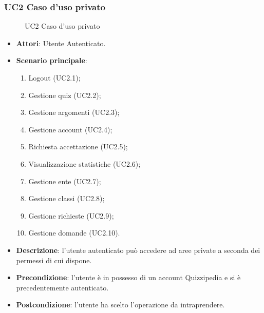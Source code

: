 \subsubsection{UC2 Caso d'uso privato}
\begin{figure}[H]
\centering
\noindent{}
\caption{UC2 Caso d'uso privato}
\end{figure}
\begin{itemize}
\item \textbf{Attori}: Utente Autenticato.
\item \textbf{Scenario principale}:
\begin{enumerate}
\item Logout (UC2.1);
\item Gestione quiz (UC2.2);
\item Gestione argomenti (UC2.3);
\item Gestione account (UC2.4);
\item Richiesta accettazione (UC2.5);
\item Visualizzazione statistiche (UC2.6);
\item Gestione ente (UC2.7);
\item Gestione classi (UC2.8);
\item Gestione richieste (UC2.9);
\item Gestione domande (UC2.10).
\end{enumerate}
\item \textbf{Descrizione}: l'utente autenticato può accedere ad aree private a seconda dei permessi di cui dispone.
\item \textbf{Precondizione}: l'utente è in possesso di un account Quizzipedia e si è precedentemente autenticato.
\item \textbf{Postcondizione}: l'utente ha scelto l'operazione da intraprendere.
\end{itemize}
